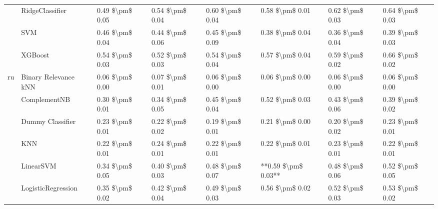 \begin{tabular}{llllllll}
   & RidgeClassifier &  0.49 \$\textbackslash pm\$ 0.05 &           0.54 \$\textbackslash pm\$ 0.04 &       0.60 \$\textbackslash pm\$ 0.04 &        0.58 \$\textbackslash pm\$ 0.01 &                         0.62 \$\textbackslash pm\$ 0.03 &      0.64 \$\textbackslash pm\$ 0.03 \\
   & SVM &  0.46 \$\textbackslash pm\$ 0.04 &           0.44 \$\textbackslash pm\$ 0.06 &       0.45 \$\textbackslash pm\$ 0.09 &        0.38 \$\textbackslash pm\$ 0.04 &                         0.36 \$\textbackslash pm\$ 0.04 &      0.39 \$\textbackslash pm\$ 0.03 \\
   & XGBoost &  0.54 \$\textbackslash pm\$ 0.03 &           0.52 \$\textbackslash pm\$ 0.03 &       0.54 \$\textbackslash pm\$ 0.04 &        0.57 \$\textbackslash pm\$ 0.04 &                         0.59 \$\textbackslash pm\$ 0.02 &      0.66 \$\textbackslash pm\$ 0.02 \\
ru & Binary Relevance kNN &  0.06 \$\textbackslash pm\$ 0.00 &           0.07 \$\textbackslash pm\$ 0.01 &       0.06 \$\textbackslash pm\$ 0.00 &        0.06 \$\textbackslash pm\$ 0.00 &                         0.06 \$\textbackslash pm\$ 0.00 &      0.06 \$\textbackslash pm\$ 0.00 \\
   & ComplementNB &  0.30 \$\textbackslash pm\$ 0.01 &           0.34 \$\textbackslash pm\$ 0.05 &       0.45 \$\textbackslash pm\$ 0.04 &        0.52 \$\textbackslash pm\$ 0.03 &                         0.43 \$\textbackslash pm\$ 0.06 &      0.39 \$\textbackslash pm\$ 0.02 \\
   & Dummy Classifier &  0.23 \$\textbackslash pm\$ 0.01 &           0.22 \$\textbackslash pm\$ 0.02 &       0.19 \$\textbackslash pm\$ 0.01 &        0.21 \$\textbackslash pm\$ 0.00 &                         0.20 \$\textbackslash pm\$ 0.02 &      0.23 \$\textbackslash pm\$ 0.01 \\
   & KNN &  0.22 \$\textbackslash pm\$ 0.01 &           0.24 \$\textbackslash pm\$ 0.01 &       0.22 \$\textbackslash pm\$ 0.01 &        0.22 \$\textbackslash pm\$ 0.01 &                         0.23 \$\textbackslash pm\$ 0.01 &      0.22 \$\textbackslash pm\$ 0.01 \\
   & LinearSVM &  0.34 \$\textbackslash pm\$ 0.05 &           0.40 \$\textbackslash pm\$ 0.03 &       0.48 \$\textbackslash pm\$ 0.07 &    **0.59 \$\textbackslash pm\$ 0.03** &                         0.48 \$\textbackslash pm\$ 0.06 &      0.52 \$\textbackslash pm\$ 0.05 \\
   & LogisticRegression &  0.35 \$\textbackslash pm\$ 0.02 &           0.42 \$\textbackslash pm\$ 0.04 &       0.49 \$\textbackslash pm\$ 0.03 &        0.56 \$\textbackslash pm\$ 0.02 &                         0.52 \$\textbackslash pm\$ 0.03 &      0.53 \$\textbackslash pm\$ 0.02 \\

\end{tabular}
